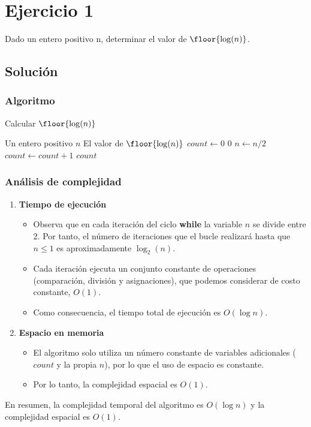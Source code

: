 \section{Ejercicio 1}
Dado un entero positivo n, determinar el valor de $\floor{\log(n)}$.

\subsection*{Solución}
\subsubsection*{Algoritmo}
\begin{algorithm}[H]
\caption{Calcular $\floor{\log(n)}$}
\begin{algorithmic}[1]
\REQUIRE Un entero positivo $n$
\ENSURE El valor de $\floor{\log(n)}$
\STATE $count \gets 0$
    \RETURN $0$
\ENDIF
{}
    \STATE $n \gets n/2$
    \STATE $count \gets count + 1$
\ENDWHILE
\RETURN $count$
\end{algorithmic}
\end{algorithm}

\subsubsection*{Análisis de complejidad}
\begin{enumerate}
\item \textbf{Tiempo de ejecución}
  \begin{itemize}
    \item Observa que en cada iteración del ciclo \textbf{while} la variable $n$ se divide entre 2. Por tanto, el número de iteraciones que el bucle realizará hasta que $n \leq 1$ es aproximadamente $\log_2(n)$.
    \item Cada iteración ejecuta un conjunto constante de operaciones (comparación, división y asignaciones), que podemos considerar de costo constante, $O(1)$.
    \item Como consecuencia, el tiempo total de ejecución es $O(\log n)$.
  \end{itemize}

\item \textbf{Espacio en memoria}
  \begin{itemize}
    \item El algoritmo solo utiliza un número constante de variables adicionales ($count$ y la propia $n$), por lo que el uso de espacio es constante.
    \item Por lo tanto, la complejidad espacial es $O(1)$.
  \end{itemize}
\end{enumerate}

En resumen, la complejidad temporal del algoritmo es $O(\log n)$ y la complejidad espacial es $O(1)$. 